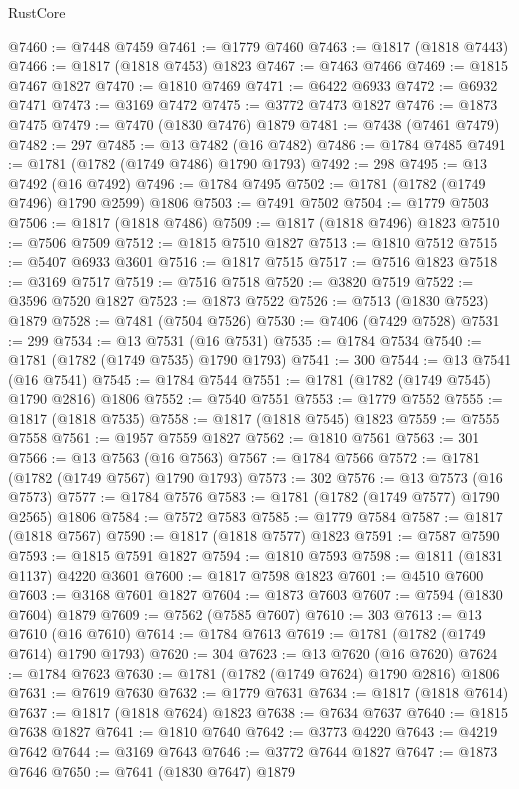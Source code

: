 \begin{lexlean}{RustCore}
\begin{coremodule}
@7460 := @7448 @7459
@7461 := @1779 @7460
@7463 := @1817 (@1818 @7443)
@7466 := @1817 (@1818 @7453) @1823
@7467 := @7463 @7466
@7469 := @1815 @7467 @1827
@7470 := @1810 @7469
@7471 := @6422 @6933
@7472 := @6932 @7471
@7473 := @3169 @7472
@7475 := @3772 @7473 @1827
@7476 := @1873 @7475
@7479 := @7470 (@1830 @7476) @1879
@7481 := @7438 (@7461 @7479)
@7482 := 297
@7485 := @13 @7482 (@16 @7482)
@7486 := @1784 @7485
@7491 := @1781 (@1782 (@1749 @7486) @1790 @1793)
@7492 := 298
@7495 := @13 @7492 (@16 @7492)
@7496 := @1784 @7495
@7502 := @1781 (@1782 (@1749 @7496) @1790 @2599) @1806
@7503 := @7491 @7502
@7504 := @1779 @7503
@7506 := @1817 (@1818 @7486)
@7509 := @1817 (@1818 @7496) @1823
@7510 := @7506 @7509
@7512 := @1815 @7510 @1827
@7513 := @1810 @7512
@7515 := @5407 @6933 @3601
@7516 := @1817 @7515
@7517 := @7516 @1823
@7518 := @3169 @7517
@7519 := @7516 @7518
@7520 := @3820 @7519
@7522 := @3596 @7520 @1827
@7523 := @1873 @7522
@7526 := @7513 (@1830 @7523) @1879
@7528 := @7481 (@7504 @7526)
@7530 := @7406 (@7429 @7528)
@7531 := 299
@7534 := @13 @7531 (@16 @7531)
@7535 := @1784 @7534
@7540 := @1781 (@1782 (@1749 @7535) @1790 @1793)
@7541 := 300
@7544 := @13 @7541 (@16 @7541)
@7545 := @1784 @7544
@7551 := @1781 (@1782 (@1749 @7545) @1790 @2816) @1806
@7552 := @7540 @7551
@7553 := @1779 @7552
@7555 := @1817 (@1818 @7535)
@7558 := @1817 (@1818 @7545) @1823
@7559 := @7555 @7558
@7561 := @1957 @7559 @1827
@7562 := @1810 @7561
@7563 := 301
@7566 := @13 @7563 (@16 @7563)
@7567 := @1784 @7566
@7572 := @1781 (@1782 (@1749 @7567) @1790 @1793)
@7573 := 302
@7576 := @13 @7573 (@16 @7573)
@7577 := @1784 @7576
@7583 := @1781 (@1782 (@1749 @7577) @1790 @2565) @1806
@7584 := @7572 @7583
@7585 := @1779 @7584
@7587 := @1817 (@1818 @7567)
@7590 := @1817 (@1818 @7577) @1823
@7591 := @7587 @7590
@7593 := @1815 @7591 @1827
@7594 := @1810 @7593
@7598 := @1811 (@1831 @1137) @4220 @3601
@7600 := @1817 @7598 @1823
@7601 := @4510 @7600
@7603 := @3168 @7601 @1827
@7604 := @1873 @7603
@7607 := @7594 (@1830 @7604) @1879
@7609 := @7562 (@7585 @7607)
@7610 := 303
@7613 := @13 @7610 (@16 @7610)
@7614 := @1784 @7613
@7619 := @1781 (@1782 (@1749 @7614) @1790 @1793)
@7620 := 304
@7623 := @13 @7620 (@16 @7620)
@7624 := @1784 @7623
@7630 := @1781 (@1782 (@1749 @7624) @1790 @2816) @1806
@7631 := @7619 @7630
@7632 := @1779 @7631
@7634 := @1817 (@1818 @7614)
@7637 := @1817 (@1818 @7624) @1823
@7638 := @7634 @7637
@7640 := @1815 @7638 @1827
@7641 := @1810 @7640
@7642 := @3773 @4220
@7643 := @4219 @7642
@7644 := @3169 @7643
@7646 := @3772 @7644 @1827
@7647 := @1873 @7646
@7650 := @7641 (@1830 @7647) @1879

\end{coremodule}
\end{lexlean}
